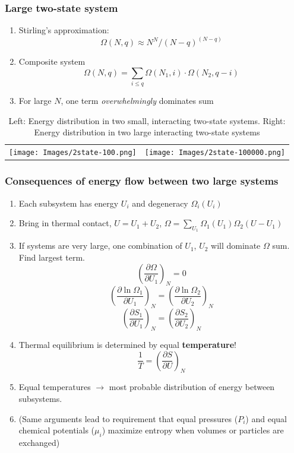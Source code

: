 \documentclass[11pt]{article}
\begin{document}
\subsubsection{Large two-state system}
\label{sec:org8075597}
\begin{enumerate}
\item Stirling's approximation:
\[\Omega(N,q) \approx N^N/(N-q)^{(N-q)}\]
\item Composite system
\[\Omega(N,q) = \sum_{i\le q} \Omega(N_1,i)\cdot \Omega(N_2,q-i) \]
\item For large \(N\), one term \emph{overwhelmingly} dominates sum
\end{enumerate}
\begin{table}
   \caption{Left: Energy distribution in two small, interacting two-state systems.  Right: Energy distribution in two large interacting two-state systems}
\begin{tabular}{cc}
\texttt{[image: Images/2state-100.png]} & \texttt{[image: Images/2state-100000.png]}
\end{tabular}
\end{table}

\subsubsection{Consequences of energy flow between two large systems}
\label{sec:orga0c53b2}
\begin{enumerate}
\item Each subsystem has energy \(U_i\) and degeneracy \(\Omega_i(U_i)\)
\item Bring in thermal contact, \(U=U_1+U_2\), \(\Omega=\sum_{U_1}\Omega_1(U_1)\Omega_2(U-U_1)\)
\item If systems are very large, one combination of \(U_1\), \(U_2\) will dominate \(\Omega\) sum. Find largest term.
\begin{displaymath}
   \left ( \frac{\partial \Omega}{\partial U_1} \right )_{N} = 0
\end{displaymath}
       \begin{displaymath}
\left ( \frac{\partial \ln \Omega_1}{\partial U_1} \right )_N = \left ( \frac{\partial \ln \Omega_2}{\partial U_2} \right )_N
       \end{displaymath}
       \begin{displaymath}
\left ( \frac{\partial S_1}{\partial U_1} \right )_N = \left ( \frac{\partial S_2}{\partial U_2} \right )_N
       \end{displaymath}
\item Thermal equilibrium is determined by equal \textbf{temperature}!
\begin{displaymath}
    \frac{1}{T}=\left ( \frac{\partial S}{\partial U} \right )_N
  \end{displaymath}
\item Equal temperatures \(\rightarrow\) most probable distribution of energy between subsystems.
\item (Same arguments lead to requirement that equal pressures (\(P_i\)) and equal chemical potentials (\(\mu_i\)) maximize entropy when volumes or particles are exchanged)
\end{enumerate}
\end{document}

